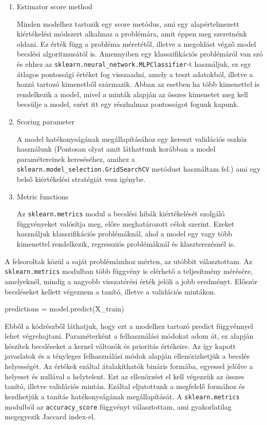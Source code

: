 \begin{enumerate}
\item Estimator score method

Minden modelhez tartozik egy score metódus, ami egy alapértelmezett kiértékelési módszert alkalmaz a problémára, amit éppen meg szeretnénk oldani. 
Ez érték függ a probléma méretétől, illetve a megoldást végző model becslési algoritmusától is.
Amennyiben egy klasszifikációs problémáról van szó és ehhez az \texttt{sklearn.neural\_network.MLPClassifier}-t használjuk, ez egy átlagos pontossági értéket fog visszaadni, amely a teszt adatokból, illetve a hozzá tartozó kimenetből származik. Abban az esetben ha több kimenettel is rendelkezik a model, mivel a minták alapján az összes kimenetet meg kell becsülje a model, ezért itt egy részhalmaz pontosságot fogunk kapunk.

\item Scoring parameter

A model hatékonyságának megállapításához egy kereszt validációs eszköz használunk (Pontosan olyat amit láthattunk korábban a model paramétereinek kereséséhez, amihez a \texttt{sklearn.model\_selection.GridSearchCV} metódust használtam fel.) ami egy belső kiértékelési stratégiát vesz igénybe.

\item Metric functions

Az \texttt{sklearn.metrics} modul a becslési hibák kiértékelését szolgáló függvényeket valósítja meg, előre meghatározott célok szerint.
Ezeket használjuk klasszifikációs problémáknál, ahol a model egy vagy több kimenettel rendelkezik, regressziós problémáknál és klaszterezésnél is.
\end{enumerate}

A felsoroltak közül a saját problémámhoz mérten, az utóbbit választottam.
Az \texttt{sklearn.metrics} modulban több függvény is elérhető a teljesítmény mérésére, amelyeknél, mindig a nagyobb visszatérési érték jelöli a jobb eredményt.
Először becsléseket kellett végeznem a tanító, illetve a validációs mintákon.

\begin{python}
predictions = model.predict(X_train)
\end{python}

Ebből a kódrészből láthatjuk, hogy ezt a modelhez tartozó predict függvénnyel lehet végrehajtani. Paraméterként a felhasználási módokat adom át, ez alapján készítek becsléseket a kernel változók és prioritás értékeire. Az így kapott javaslatok és a tényleges felhasználási módok alapján ellenörizhetjük a becslés helyességét. Az értékek ezáltal átalakíthatók bináris formába, egyessel jelölve a helyeset és nullával a helytelent. Ezt az ellenörzést el kell végezzük az összes tanító, illetve validációs mintán.
Ezáltal eljutottunk a megfelelő formához és kezdhetjük a tanítás hatékonyságának megállapítását.
A \texttt{sklearn.metrics} modulból az \texttt{accuracy\_score} függvényt választottam, ami gyakorlatilag megegyezik Jaccard index-el.

